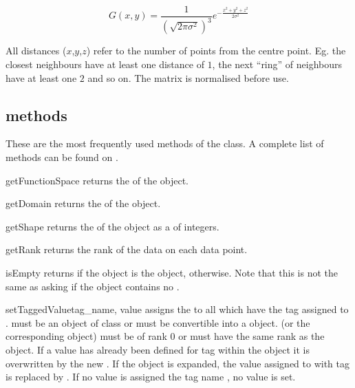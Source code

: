 \[ G(x,y) = \frac{1}{(\sqrt{2\pi\sigma^2})^3} e^{-\frac{x^2+y^2+z^2}{2\sigma^2}} \]

All distances ($x$,$y$,$z$) refer to the number of points from the centre point. 
Eg. the closest neighbours have at least one distance of $1$, the next ``ring'' of neighbours have at least one $2$ and so on.
The matrix is normalised before use.

\subsection{\Data methods}
These are the most frequently used methods of the \Data class.
A complete list of methods can be found on \ReferenceGuide.

\begin{methoddesc}[Data]{getFunctionSpace}{}
returns the \FunctionSpace of the object.
\end{methoddesc}

\begin{methoddesc}[Data]{getDomain}{}
returns the \Domain of the object.
\end{methoddesc}

\begin{methoddesc}[Data]{getShape}{}
returns the \Shape of the object as a  of integers.
\end{methoddesc}

\begin{methoddesc}[Data]{getRank}{}
returns the rank of the data on each data point.
\end{methoddesc}

\begin{methoddesc}[Data]{isEmpty}{}
returns \True if the \Data object is the \EmptyData object, \False otherwise.
Note that this is not the same as asking if the object contains no \DataSamplePoints.
\end{methoddesc}

\begin{methoddesc}[Data]{setTaggedValue}{tag_name, value}
assigns the  to all \DataSamplePoints which have the tag
assigned to .  must be an object of class
 or must be convertible into a  object.
 (or the corresponding  object) must be of
rank $0$ or must have the same rank as the object.
If a value has already been defined for tag  within the object
it is overwritten by the new . If the object is expanded,
the value assigned to \DataSamplePoints with tag  is replaced by
. If no value is assigned the tag name , no value is set.
\end{methoddesc}

